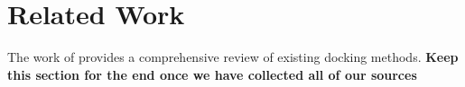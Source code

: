 \section{Related Work}
The work of \citet{app131910675} provides a comprehensive review of existing docking methods.
\textbf{Keep this section for the end once we have collected all of our sources}

